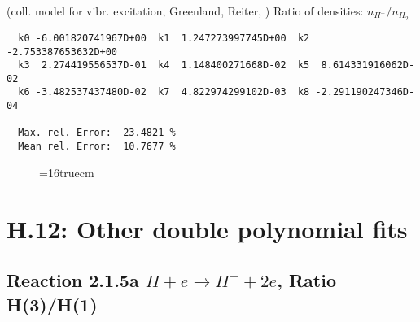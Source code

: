 \documentclass[12pt]{article}
\begin{document}
  (coll. model for vibr. excitation, Greenland, Reiter, \cite{kn:Green})
  Ratio of densities: $n_{H^-}/n_{H_2}$

\begin{small}\begin{verbatim}
  k0 -6.001820741967D+00  k1  1.247273997745D+00  k2 -2.753387653632D+00
  k3  2.274419556537D-01  k4  1.148400271668D-02  k5  8.614331916062D-02
  k6 -3.482537437480D-02  k7  4.822974299102D-03  k8 -2.291190247346D-04

  Max. rel. Error:  23.4821 %
  Mean rel. Error:  10.7677 %
\end{verbatim}\end{small}

\begin{figure} \label{7.0}
\epsfxsize=16truecm
\end{figure}

\newpage

\section{H.12: Other double polynomial fits}

\subsection{
Reaction 2.1.5a  $H + e \rightarrow H^+ + 2e $, Ratio H(3)/H(1)
}
\end{document}

